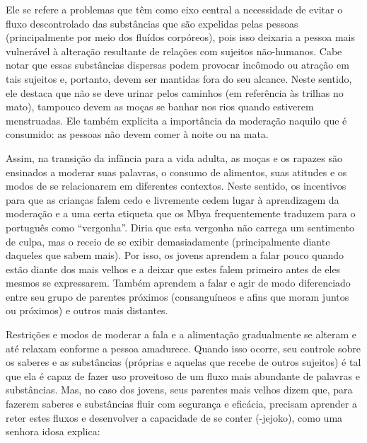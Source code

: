 \documentclass{article}
\begin{document}
Ele se refere a problemas que t\^em como eixo central a necessidade de
evitar o fluxo descontrolado das subst\^ancias que s\~ao expelidas
pelas pessoas (principalmente por meio dos flu\'idos corp\'oreos), pois
isso deixaria a pessoa mais vulner\'avel \`a altera\c{c}\~ao resultante
de rela\c{c}\~oes com sujeitos n\~ao-humanos. Cabe notar que essas
subst\^ancias dispersas podem provocar inc\^omodo ou atra\c{c}\~ao em
tais sujeitos e, portanto, devem ser mantidas fora do seu alcance.
Neste sentido, ele destaca que n\~ao se deve urinar pelos caminhos (em
refer\^encia \`as trilhas no mato), tampouco devem as mo\c{c}as se
banhar nos rios quando estiverem menstruadas. Ele tamb\'em explicita a
import\^ancia da modera\c{c}\~ao naquilo que \'e consumido: as pessoas
n\~ao devem comer \`a noite ou na mata. 

Assim, na transi\c{c}\~ao da inf\^ancia para a vida adulta, as mo\c{c}as
e os rapazes s\~ao ensinados a moderar suas palavras, o consumo de
alimentos, suas atitudes e os modos de se relacionarem em diferentes
contextos. Neste sentido, os incentivos para que as crian\c{c}as falem
cedo e livremente cedem lugar \`a aprendizagem da modera\c{c}\~ao e a
uma certa etiqueta que os Mbya frequentemente traduzem para o
portugu\^es como {\textquotedblleft}vergonha{\textquotedblright}. Diria
que esta vergonha n\~ao carrega um sentimento de culpa, mas o receio de
se exibir demasiadamente (principalmente diante daqueles que sabem
mais). Por isso, os jovens aprendem a falar pouco quando est\~ao diante
dos mais velhos e a deixar que estes falem primeiro antes de eles
mesmos se expressarem. Tamb\'em aprendem a falar e agir de modo
diferenciado entre seu grupo de parentes pr\'oximos (consangu\'ineos e
afins que moram juntos ou pr\'oximos) e outros mais distantes. 

Restri\c{c}\~oes e modos de moderar a fala e a alimenta\c{c}\~ao
gradualmente se alteram e at\'e relaxam conforme a pessoa amadurece.
Quando isso ocorre, seu controle sobre os saberes e as subst\^ancias
(pr\'oprias e aquelas que recebe de outros sujeitos) \'e tal que ela
\'e capaz de fazer uso proveitoso de um fluxo mais abundante de
palavras e subst\^ancias. Mas, no caso dos jovens, seus parentes mais
velhos dizem que, para fazerem saberes e subst\^ancias fluir com
seguran\c{c}a e efic\'acia, precisam aprender a reter estes fluxos e
desenvolver a capacidade de se conter (-jejoko), como uma senhora idosa
explica:
\end{document}
